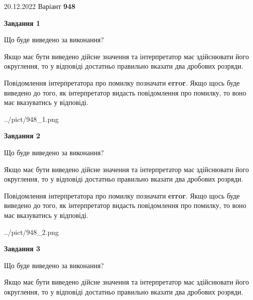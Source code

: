 \documentclass[12pt, ukrainian]{article}
\begin{document}
{20.12.2022 Варіант \No \textbf { 948 }\par}
{
\begin {Large}

{\begin {center}\textbf{Завдання 1}\end {center}}\par
Що буде виведено за виконання? \par

Якщо має бути виведено дійсне значення та інтерпретатор має здійснювати його округлення, 
то у відповіді достатньо правильно вказати два дробових розряди.

Повідомлення інтерпретатора про помилку позначати \textbf{error}.
Якщо щось буде виведено до того, як інтерпретатор видасть повідомлення про помилку, 
то воно має вказуватись у відповіді. \par

\begin{center}
	{../pict/948_1.png}
\end{center}
\newpage

{\begin {center}\textbf{Завдання 2}\end {center}}\par
Що буде виведено за виконання? \par

Якщо має бути виведено дійсне значення та інтерпретатор має здійснювати його округлення, 
то у відповіді достатньо правильно вказати два дробових розряди.

Повідомлення інтерпретатора про помилку позначати \textbf{error}.
Якщо щось буде виведено до того, як інтерпретатор видасть повідомлення про помилку, 
то воно має вказуватись у відповіді. \par

\begin{center}
	{../pict/948_2.png}
\end{center}
\newpage

{\begin {center}\textbf{Завдання 3}\end {center}}\par
Що буде виведено за виконання? \par

Якщо має бути виведено дійсне значення та інтерпретатор має здійснювати його округлення, 
то у відповіді достатньо правильно вказати два дробових розряди.


\end{Large}}
\end{document}
